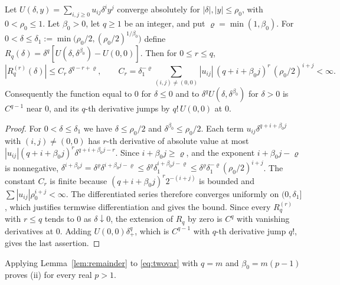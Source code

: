 \begin{lemma}\label{lem:remainder}
Let $U(\delta,y)=\sum_{i,j\ge0}u_{ij}\delta^iy^j$ converge absolutely for $|\delta|,|y|\le\rho_0$, with $0<\rho_0\le1$. Let $\beta_0>0$, let $q\ge1$ be an integer, and put $\varrho=\min(1,\beta_0)$. For $0<\delta\le\delta_1:=\min\bigl(\rho_0/2,(\rho_0/2)^{1/\beta_0}\bigr)$ define $R_q(\delta)=\delta^q[U(\delta,\delta^{\beta_0})-U(0,0)]$. Then for $0\le r\le q$,
\[
 |R_q^{(r)}(\delta)|\le C_r\,\delta^{q-r+\varrho},\qquad
 C_r=\delta_1^{-\varrho}\sum_{(i,j)\ne(0,0)}|u_{ij}|\,(q+i+\beta_0j)^r\,(\rho_0/2)^{i+j}<\infty.
\]
Consequently the function equal to $0$ for $\delta\le0$ and to $\delta^qU(\delta,\delta^{\beta_0})$ for $\delta>0$ is $C^{q-1}$ near $0$, and its $q$-th derivative jumps by $q!\,U(0,0)$ at $0$.
\end{lemma}
\begin{proof}
For $0<\delta\le\delta_1$ we have $\delta\le\rho_0/2$ and $\delta^{\beta_0}\le\rho_0/2$. Each term $u_{ij}\delta^{q+i+\beta_0j}$ with $(i,j)\ne(0,0)$ has $r$-th derivative of absolute value at most $|u_{ij}|(q+i+\beta_0j)^r\delta^{q+i+\beta_0j-r}$. Since $i+\beta_0j\ge\varrho$, and the exponent $i+\beta_0j-\varrho$ is nonnegative, $\delta^{i+\beta_0j}=\delta^\varrho\delta^{i+\beta_0j-\varrho}\le\delta^\varrho\delta_1^{i+\beta_0j-\varrho}\le\delta^\varrho\delta_1^{-\varrho}(\rho_0/2)^{i+j}$. The constant $C_r$ is finite because $(q+i+\beta_0j)^r2^{-(i+j)}$ is bounded and $\sum|u_{ij}|\rho_0^{i+j}<\infty$. The differentiated series therefore converges uniformly on $(0,\delta_1]$, which justifies termwise differentiation and gives the bound. Since every $R_q^{(r)}$ with $r\le q$ tends to $0$ as $\delta\downarrow0$, the extension of $R_q$ by zero is $C^q$ with vanishing derivatives at $0$. Adding $U(0,0)\delta_+^q$, which is $C^{q-1}$ with $q$-th derivative jump $q!$, gives the last assertion.
\end{proof}

Applying Lemma~\ref{lem:remainder} to \eqref{eq:twovar} with $q=m$ and $\beta_0=m(p-1)$ proves (ii) for every real $p>1$.

